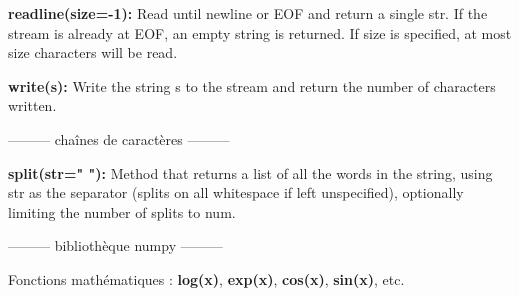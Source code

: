 \documentclass[11pt,fleqn]{book} %
\begin{document}
\vspace{.5cm}

\textsf{\textbf{readline(size=-1):}} Read until newline or EOF and return a single str. If the stream is already at EOF, an empty string is returned.
If size is specified, at most size characters will be read.

\vspace{.5cm}

\textsf{\textbf{write(s):}} Write the string s to the stream and return the number of characters written.

\begin{center}
--------- chaînes de caractères ---------
\end{center}

\textsf{\textbf{split(str=" "):}} Method that returns a list of all the words in the string, using str as the separator (splits on all whitespace if left unspecified), optionally limiting the number of splits to num.

\begin{center}
--------- bibliothèque numpy ---------
\end{center}

Fonctions mathématiques : \textsf{\textbf{log(x)}}, \textsf{\textbf{exp(x)}}, \textsf{\textbf{cos(x)}}, \textsf{\textbf{sin(x)}}, etc.
\end{document}
